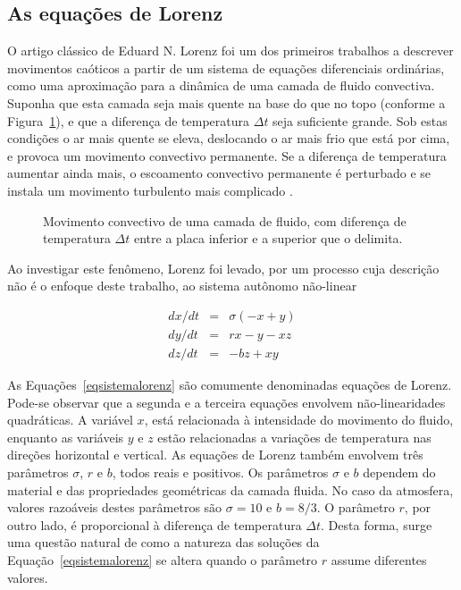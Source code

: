 \subsection{As equações de Lorenz}
O artigo clássico de Eduard N. Lorenz \cite{lor/63} foi um dos primeiros trabalhos a descrever movimentos caóticos a partir de um sistema de equações diferenciais ordinárias, como uma aproximação para a dinâmica de uma camada de fluido convectiva. Suponha que esta camada seja mais quente na base do que no topo (conforme a Figura~\ref{figconveclorenz}), e que a diferença de temperatura $\Delta t$ seja suficiente grande. Sob estas condições o ar mais quente se eleva, deslocando o ar mais frio que está por cima, e provoca um movimento convectivo permanente. Se a diferença de temperatura aumentar ainda mais, o escoamento convectivo permanente é perturbado e se instala um movimento turbulento mais complicado \cite{boyce/99}.

\begin{figure}[ht]
\centering {} 
\caption{Movimento convectivo de uma camada de fluido, com diferença de temperatura $\Delta t$ entre a placa inferior e a superior que o delimita.}
\label{figconveclorenz}
\end{figure}

Ao investigar este fenômeno, Lorenz foi levado, por um processo cuja descrição não é o enfoque deste trabalho, ao sistema autônomo não-linear 

\begin{equation}
\begin{array}{ccc} dx/dt & = & \sigma(-x+y) \\ dy/dt & = & rx-y-xz \\ dz/dt & = & -bz+xy \end{array}
\label{eqsistemalorenz}
\end{equation}

As Equações~\ref{eqsistemalorenz} são comumente denominadas equações de Lorenz. Pode-se observar que a segunda e a terceira equações envolvem não-linearidades quadráticas. A variável $x$, está relacionada à intensidade do movimento do fluido, enquanto as variáveis $y$ e $z$ estão relacionadas a variações de temperatura nas direções horizontal e vertical. As equações de Lorenz também envolvem três parâmetros $\sigma$, $r$ e $b$, todos reais e positivos. Os parâmetros $\sigma$ e $b$ dependem do material e das propriedades geométricas da camada fluida. No caso da atmosfera, valores razoáveis destes parâmetros são 
$\sigma=10$ e $b=8/3$. O parâmetro $r$, por outro lado, é proporcional à diferença de temperatura $\Delta t$. Desta forma, surge uma questão natural de como a natureza das soluções da Equação~\ref{eqsistemalorenz} se altera quando o parâmetro $r$ assume diferentes valores.

